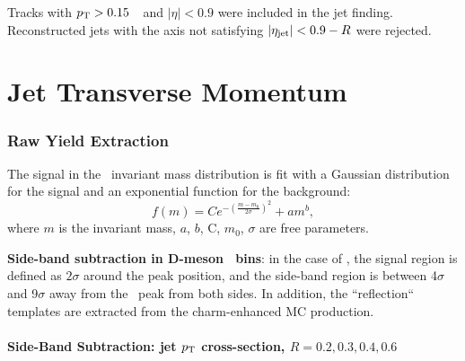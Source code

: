 Tracks with $p_{\rm T}>0.15$~\GeVc\ and $|\eta|<0.9$ were included in the jet finding. 
Reconstructed jets with the axis not satisfying $|\eta_{\mathrm{jet}}|<0.9-R$ were rejected.

\part{Jet Transverse Momentum}

\section{Raw Yield Extraction}
\label{sect:raw_yield}
The signal in the \Dzero\ invariant mass distribution is fit with a Gaussian distribution for the signal and an exponential function for the background:
\begin{equation}
\label{e_sigbkgDZero}
f (m) = Ce^{-(\frac{m-m_0}{2\sigma})^2} + am^b,
\end{equation}
where $m$ is the invariant mass, $a$, $b$, C, $m_0$, $\sigma$ are free parameters.

{\bf Side-band subtraction in D-meson \pt\ bins}: in the case of \Dzero, the signal region is defined as $2\sigma$ around the peak position, and the side-band region is between 4$\sigma$ and 9$\sigma$ away from the \Dzero\ peak from both sides.
In addition, the ``reflection`` templates are extracted from the charm-enhanced MC production.

\subsection{Side-Band Subtraction: jet $p_{\text T}$ cross-section, $R=0.2, 0.3, 0.4, 0.6$}
\label{sub_Bin_d_pT}

